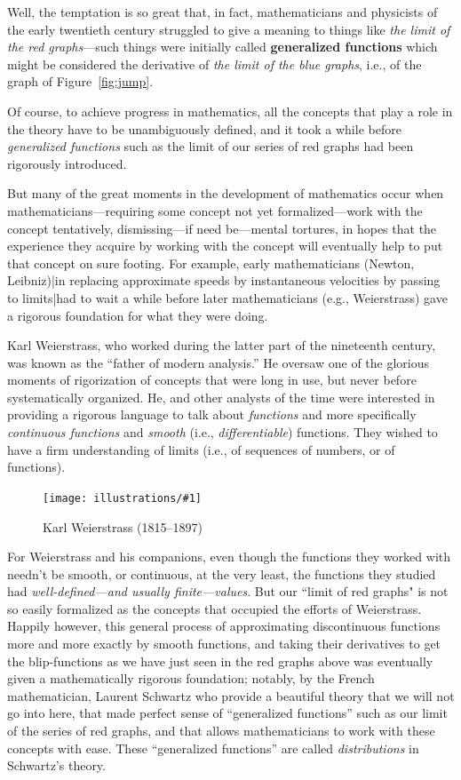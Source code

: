 \documentclass[11pt]{article}
\newcommand{\ill}[3]{ 
   \begin{figure}[H]
   \begin{center}
   \texttt{[image: illustrations/\#1]}
   \caption{#3}
   \end{center}
    \end{figure}
}
\theoremstyle{plain}
\theoremstyle{definition}
\numberwithin{equation}{section}
\numberwithin{figure}{section}
\numberwithin{table}{section}
\begin{document}
  Well, the temptation is so great that, in fact, mathematicians and physicists of the early twentieth century struggled to give a meaning to things like {\it the limit of the red graphs}---such things were initially called {\bf generalized functions} which might be considered the derivative of {\it the limit of the blue graphs}, i.e., of the graph of Figure~\ref{fig:jump}.
  
  
  Of course, to achieve progress in mathematics, all the concepts that play a role in the theory have to be unambiguously defined,  and it took a while before {\it generalized functions} such as the limit of our series of red graphs had been rigorously introduced.
  
     But many of the great moments in the development of mathematics occur when mathematicians---requiring some concept not yet formalized---work with the concept tentatively, dismissing---if need be---mental tortures, in hopes that the experience they acquire by working with the concept will eventually help to put that concept on sure footing. For example,  early
mathematicians (Newton, Leibniz)|in replacing approximate speeds by instantaneous velocities
by passing to limits|had to wait a while before later mathematicians (e.g., Weierstrass) gave a
rigorous foundation for what they were doing.  
   
   Karl Weierstrass, who worked during the latter part of the nineteenth century, was known as the ``father of modern analysis.'' He oversaw one of the glorious moments of rigorization of concepts that were long in use, but never before systematically organized.  He, and other analysts of the time were interested in providing a  rigorous language to talk about {\it functions} and more specifically {\it continuous functions} and {\it smooth} (i.e., {\it differentiable}) functions. They wished to have a firm understanding of limits (i.e., of sequences of numbers, or of functions).  
 
 \ill{weierstrass}{.3}{Karl Weierstrass (1815--1897)} 
   
    For Weierstrass and his companions, even though the functions they worked with needn't be smooth, or continuous, at the very least, the functions they studied had {\it well-defined---and usually finite---values}.   But our ``limit of red graphs" is not so easily formalized as the concepts that occupied the efforts of Weierstrass. Happily however, this general process 
of approximating discontinuous functions more and more exactly by smooth functions, and taking
their derivatives to get the blip-functions as we have just seen in the red graphs above was eventually given a mathematically rigorous
foundation; notably, by the French mathematician, Laurent Schwartz who provide a beautiful theory that we will not go into here, that made perfect sense of ``generalized functions'' such as our limit of the series of red graphs, and that allows mathematicians to work with these concepts with ease. These ``generalized functions''  are called {\it distributions} in Schwartz's theory.
\end{document}
